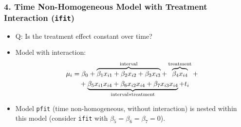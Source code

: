 \documentclass[oneside]{book}\usepackage[]{graphicx}\usepackage[svgnames]{xcolor}
\let\log\relax%
\begin{document}
\subsubsection*{4. Time Non-Homogeneous Model with Treatment Interaction (\texttt{ifit})}
\begin{itemize}
      \item Q: Is the treatment effect constant over time?
      \item Model with interaction:
            \textcolor{Green}{\begin{align*}
                        \log{\mu_i}
                         & =\beta_0+\overbrace{\beta_1x_{i1}+\beta_2x_{i2}+\beta_3x_{i3}}^{\text{interval}}+\overbrace{\beta_4x_{i4}}^{\text{treatment}}+ \\
                         & \quad +\underbrace{\beta_5x_{i1}x_{i4}+\beta_6x_{i2}x_{i4}+\beta_7x_{i3}x_{i4}}_{\text{interval$*$treatment}}+\log{t_i}
                  \end{align*}}
      \item Model \texttt{pfit} (time non-homogeneous, without interaction) is nested within this
            model (consider \texttt{ifit} with $ \beta_5=\beta_6=\beta_7=0 $).
\end{itemize}
\end{document}
